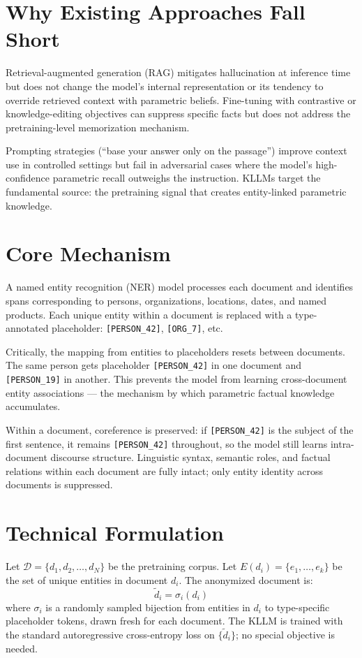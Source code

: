 \documentclass[10pt,twocolumn]{article}
\begin{document}
\section{Why Existing Approaches Fall Short}

Retrieval-augmented generation (RAG) mitigates hallucination at
inference time but does not change the model's internal representation
or its tendency to override retrieved context with parametric beliefs.
Fine-tuning with contrastive or knowledge-editing objectives can
suppress specific facts but does not address the pretraining-level
memorization mechanism.

Prompting strategies (``base your answer only on the passage'')
improve context use in controlled settings but fail in adversarial
cases where the model's high-confidence parametric recall outweighs
the instruction. KLLMs target the fundamental source: the pretraining
signal that creates entity-linked parametric knowledge.

\section{Core Mechanism}

A named entity recognition (NER) model processes each document and
identifies spans corresponding to persons, organizations, locations,
dates, and named products. Each unique entity within a document is
replaced with a type-annotated placeholder: \texttt{[PERSON\_42]},
\texttt{[ORG\_7]}, etc.

Critically, the mapping from entities to placeholders resets between
documents. The same person gets placeholder \texttt{[PERSON\_42]} in
one document and \texttt{[PERSON\_19]} in another. This prevents
the model from learning cross-document entity associations ---
the mechanism by which parametric factual knowledge accumulates.

Within a document, coreference is preserved: if \texttt{[PERSON\_42]}
is the subject of the first sentence, it remains \texttt{[PERSON\_42]}
throughout, so the model still learns intra-document discourse structure.
Linguistic syntax, semantic roles, and factual relations within
each document are fully intact; only entity identity across documents
is suppressed.

\section{Technical Formulation}

Let $\mathcal{D} = \{d_1, d_2, \ldots, d_N\}$ be the pretraining
corpus. Let $E(d_i) = \{e_1, \ldots, e_k\}$ be the set of unique
entities in document $d_i$. The anonymized document is:
\[
\tilde{d}_i = \sigma_i(d_i)
\]
where $\sigma_i$ is a randomly sampled bijection from entities in
$d_i$ to type-specific placeholder tokens, drawn fresh for each
document. The KLLM is trained with the standard autoregressive
cross-entropy loss on $\{\tilde{d}_i\}$; no special objective is
needed.
\end{document}

